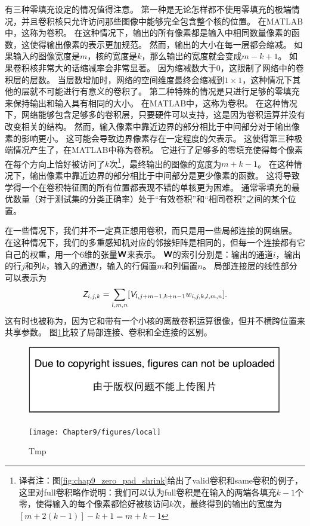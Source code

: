 有三种零填充设定的情况值得注意。
第一种是无论怎样都不使用零填充的极端情况，并且卷积核只允许访问那些图像中能够完全包含整个核的位置。
在MATLAB中，这称为卷积。
在这种情况下，输出的所有像素都是输入中相同数量像素的函数，这使得输出像素的表示更加规范。
然而，输出的大小在每一层都会缩减。
如果输入的图像宽度是$m$，核的宽度是$k$，那么输出的宽度就会变成$m-k+1$。
如果卷积核非常大的话缩减率会非常显著。
因为缩减数大于0，这限制了网络中的卷积层的层数。
当层数增加时，网络的空间维度最终会缩减到$1\times 1$，这种情况下其他的层就不可能进行有意义的卷积了。
第二种特殊的情况是只进行足够的零填充来保持输出和输入具有相同的大小。
在MATLAB中，这称为卷积。
在这种情况下，网络能够包含足够多的卷积层，只要硬件可以支持，这是因为卷积运算并没有改变相关的结构。
然而，输入像素中靠近边界的部分相比于中间部分对于输出像素的影响更小。
这可能会导致边界像素存在一定程度的欠表示。
这使得第三种极端情况产生了，在MATLAB中称为卷积。
它进行了足够多的零填充使得每个像素在每个方向上恰好被访问了$k$次\footnote{译者注：图\ref{fig:chap9_zero_pad_shrink}给出了\gls{valid}卷积和\gls{same}卷积的例子，这里对\gls{full}卷积略作说明：我们可以认为\gls{full}卷积是在输入的两端各填充$k-1$个零，使得输入的每个像素都恰好被核访问$k$次，最终得到的输出的宽度为$[m+2(k-1)]-k+1=m+k-1$}，最终输出的图像的宽度为$m+k-1$。%
在这种情况下，输出像素中靠近边界的部分相比于中间部分是更少像素的函数。
这将导致学得一个在卷积特征图的所有位置都表现不错的单核更为困难。
通常零填充的最优数量（对于测试集的分类正确率）处于``有效卷积''和``相同卷积''之间的某个位置。

 

在一些情况下，我们并不一定真正想用卷积，而只是用一些局部连接的网络层\citep{LeCun86,LeCun89a}。
在这种情况下，我们的多重感知机对应的邻接矩阵是相同的，但每一个连接都有它自己的权重，用一个6维的张量$\textsf{\textbf{W}}$来表示。
$\textsf{\textbf{W}}$的索引分别是：输出的通道$i$，输出的行$j$和列$k$，输入的通道$l$，输入的行偏置$m$和列偏置$n$。
局部连接层的线性部分可以表示为
\begin{equation}
\textit{\textsf{Z}}_{i,j,k} = \sum_{l,m,n} [\textit{\textsf{V}}_{l, j+m-1, k+n-1} w_{i, j, k, l, m, n}].
\end{equation}
这有时也被称为，因为它和带有一个小核的离散卷积运算很像，但并不横跨位置来共享参数。
图\ref{fig:chap9_local}比较了局部连接、卷积和全连接的区别。
\begin{figure}[!htb]
\ifOpenSource
\centerline{\includegraphics{figure.pdf}}
\else
\centerline{\texttt{[image: Chapter9/figures/local]}}
\fi
\caption{Tmp}
\label{fig:chap9_local}
\end{figure}
 
